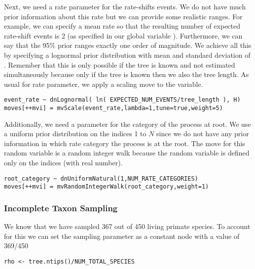 Next, we need a rate parameter for the rate-shifts events.
We do not have much prior information about this rate but we can provide some realistic ranges.
For example, we can specify a mean rate so that the resulting number of expected rate-shift events is 2 (as specified in our global variable ).
Furthermore, we can say that the 95\% prior ranges exactly one order of magnitude.
We achieve all this by specifying a lognormal prior distribution with mean  and standard deviation of .
Remember that this is only possible if the tree is known and not estimated simultaneously because only if the tree is known then we also the tree length. 
As usual for rate parameter, we apply a scaling move to the  variable.
{\tt \begin{snugshade*}
\begin{lstlisting}
event_rate ~ dnLognormal( ln( EXPECTED_NUM_EVENTS/tree_length ), H)
moves[++mvi] = mvScale(event_rate,lambda=1,tune=true,weight=5)
\end{lstlisting}
\end{snugshade*}}

Additionally, we need a parameter for the category of the process at root.
We use a uniform prior distribution on the indices 1 to $N$ since we do not have any prior information in which rate category the process is at the root.
The move for this random variable is a random integer walk because the random variable is defined only on the indices (\CF with real number).
{\tt \begin{snugshade*}
\begin{lstlisting}
root_category ~ dnUniformNatural(1,NUM_RATE_CATEGORIES)
moves[++mvi] = mvRandomIntegerWalk(root_category,weight=1)
\end{lstlisting}
\end{snugshade*}}



\subsubsection{Incomplete Taxon Sampling}

We know that we have sampled 367 out of 450 living primate species. 
To account for this we can set the sampling parameter as a constant node with a value of 369/450
{\tt \begin{snugshade*}
\begin{lstlisting}
rho <- tree.ntips()/NUM_TOTAL_SPECIES
\end{lstlisting}
\end{snugshade*}}


